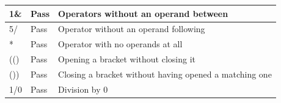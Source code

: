 \documentclass[a4paper, oneside, 11pt]{report}
\begin{document}
\begin{table}[h]
\begin{tabular}{|l|l|l|}
1\&                 & Pass               & Operators without an operand between                                                 \\ \hline
5/                  & Pass               & Operator without an operand following                                                \\ \hline
*                   & Pass               & Operator with no operands at all                                                     \\ \hline
(()                 & Pass               & Opening a bracket without closing it                                                 \\ \hline
())                 & Pass               & Closing a bracket without having opened a matching one                               \\ \hline
1/0                 & Pass               & Division by 0                                                                        \\ \hline
\end{tabular}
\end{table}

\newpage
\end{document}
